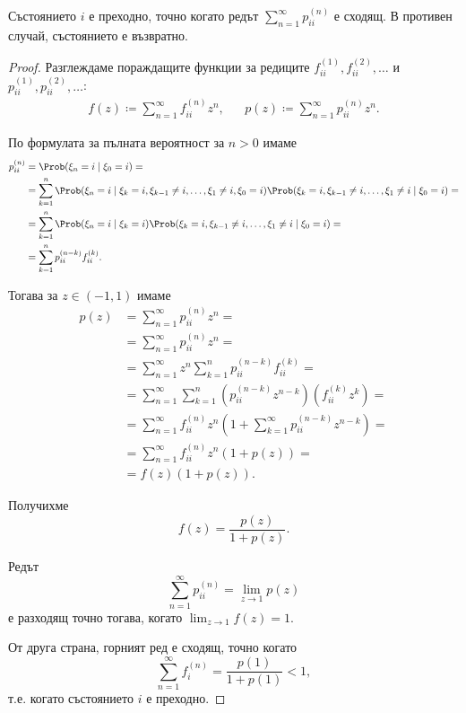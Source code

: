 \documentclass[numbers=endperiod, bibliography=totocnumbered]{scrartcl}
\begin{document}
\begin{theorem}\label{thm:state_is_transient_iff_p_is_divergent}
  Състоянието \( i \) е преходно, точно когато редът \( \sum_{n=1}^\infty p^{(n)}_{ii} \) е сходящ. В противен случай, състоянието е възвратно.
\end{theorem}
\begin{proof}
  Разглеждаме пораждащите функции за редиците \( f_{ii}^{(1)}, f_{ii}^{(2)}, \ldots \) и \( p_{ii}^{(1)}, p_{ii}^{(2)}, \ldots \):
  \begin{align*}
    f(z) \coloneqq \sum_{n=1}^\infty f_{ii}^{(n)} z^n,
    &&
    p(z) \coloneqq \sum_{n=1}^\infty p_{ii}^{(n)} z^n.
  \end{align*}

  По формулата за пълната вероятност за \( n > 0 \) имаме
  \small{
  \begin{align*}
    p_{ii}^{(n)}
    &=
    \Prob(\xi_n = i \mid \xi_0 = i)
    = \\ &=
    \sum_{k=1}^n \Prob(\xi_n = i \mid \xi_k = i, \xi_{k-1} \neq i, \ldots, \xi_1 \neq i, \xi_0 = i) \Prob(\xi_k = i, \xi_{k-1} \neq i, \ldots, \xi_1 \neq i \mid \xi_0 = i)
    = \\ &=
    \sum_{k=1}^n \Prob(\xi_n = i \mid \xi_k = i) \Prob(\xi_k = i, \xi_{k-1} \neq i, \ldots, \xi_1 \neq i \mid \xi_0 = i)
    = \\ &=
    \sum_{k=1}^n p_{ii}^{(n-k)} f_{ii}^{(k)}.
  \end{align*}
  }

  Тогава за \( z \in (-1, 1) \) имаме
  \begin{align*}
    p(z)
    &=
    \sum_{n=1}^\infty p_{ii}^{(n)} z^n
    = \\ &=
    \sum_{n=1}^\infty p_{ii}^{(n)} z^n
    = \\ &=
    \sum_{n=1}^\infty z^n \sum_{k=1}^n p_{ii}^{(n-k)} f_{ii}^{(k)}
    = \\ &=
    \sum_{n=1}^\infty \sum_{k=1}^n (p_{ii}^{(n-k)} z^{n-k}) (f_{ii}^{(k)} z^k)
    = \\ &=
    \sum_{n=1}^\infty f_{ii}^{(n)} z^n \left( 1 + \sum_{k=1}^\infty p_{ii}^{(n-k)} z^{n-k} \right)
    = \\ &=
    \sum_{n=1}^\infty f_{ii}^{(n)} z^n (1 + p(z))
    = \\ &=
    f(z) (1 + p(z)).
  \end{align*}

  Получихме
  \begin{equation*}
    f(z) = \frac {p(z)} {1 + p(z)}.
  \end{equation*}

  Редът
  \begin{equation*}
    \sum_{n=1}^\infty p^{(n)}_{ii} = \lim_{z \to 1} p(z)
  \end{equation*}
  е разходящ точно тогава, когато \( \lim_{z \to 1} f(z) = 1 \).

  От друга страна, горният ред е сходящ, точно когато
  \begin{equation*}
    \sum_{n=1}^\infty f_i^{(n)} = \frac {p(1)} {1 + p(1)} < 1,
  \end{equation*}
  т.е. когато състоянието \( i \) е преходно.
\end{proof}
\end{document}
